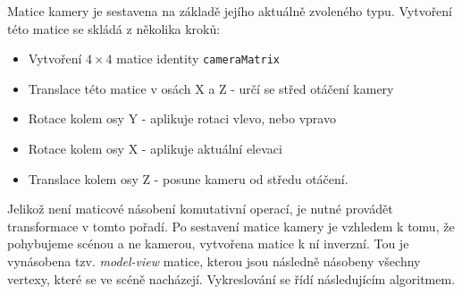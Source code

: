Matice kamery je sestavena na základě jejího aktuálně zvoleného typu. Vytvoření této matice se skládá z několika kroků:

\begin{itemize}
\item Vytvoření $4\times4$ matice identity \texttt{cameraMatrix}
\item Translace této matice v osách X a Z - určí se střed otáčení kamery
\item Rotace kolem osy Y - aplikuje rotaci vlevo, nebo vpravo
\item Rotace kolem osy X -  aplikuje aktuální elevaci
\item Translace kolem osy Z - posune kameru od středu otáčení.
\end{itemize}

Jelikož není maticové násobení komutativní operací, je nutné provádět transformace v tomto pořadí. Po sestavení matice kamery je vzhledem k tomu, že pohybujeme scénou a ne kamerou, vytvořena matice k ní inverzní. Tou je vynásobena tzv. \textit{model-view} matice, kterou jsou následně násobeny všechny vertexy, které se ve scéně nacházejí. Vykreslování se řídí následujícím algoritmem.


